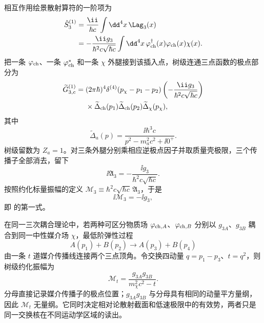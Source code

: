 \begin{exbox}
相互作用绘景散射算符的一阶项为
\begin{align*}
\hat S_3^{(1)}
&=\frac{\ii}{\hbar c}\int\dd^4 x\,\Lag_3(x)\\
&=-\frac{\ii g_3}{\hbar^2c\sqrt{\hbar c}}
\int\dd^4 x\,
\varphi_{\rm ch}^\dagger(x)\varphi_{\rm ch}(x)\chi(x).
\end{align*}
把一条 $\varphi_{\rm ch}$、一条 $\varphi_{\rm ch}^\ast$ 和一条 $\chi$ 外腿接到该插入点，树级连通三点函数的极点部分为
\begin{align*}
\widetilde G_{3,c}^{(1)}
={}&(2\pi\hbar)^4\delta^{(4)}(p_\chi-p_1-p_2)
\left(-\frac{\ii g_3}{\hbar^2c\sqrt{\hbar c}}\right)\\
&\times
\widetilde\Delta_{\rm ch}(p_1)
\widetilde\Delta_{\rm ch}(p_2)
\widetilde\Delta_\chi(p_\chi),
\end{align*}
其中
\begin{equation*}
\widetilde\Delta_a(p)
=\frac{\ii\hbar^3c}{p^2-m_a^2c^2+\ii0^+}.
\end{equation*}
树级留数为 $Z_a=1$。对三条外腿分别乘相应逆极点因子并取质量壳极限，三个传播子全部消去，留下
\begin{equation*}
\ii\mathfrak A_3
=-\frac{\ii g_3}{\hbar^2c\sqrt{\hbar c}}.
\end{equation*}
按照约化标量振幅的定义
$\mathcal M_3\equiv\hbar^2c\sqrt{\hbar c}\,\mathfrak A_3$，于是
\begin{equation*}
\ii\mathcal M_3=-\ii g_3,
\end{equation*}
即 的第一式。
\end{exbox}

在同一三次耦合理论中，若两种可区分物质场 $\varphi_{{\rm ch},A}$、$\varphi_{{\rm ch},B}$ 分别以 $g_{3A}$、$g_{3B}$ 耦合到同一中性媒介场 $\chi$，最低阶弹性过程
\[
A(p_1)+B(p_2)\to A(p_3)+B(p_4)
\]
由一条 $t$ 道媒介传播线连接两个三点顶角。令交换四动量 $q=p_1-p_3$、$t=q^2$，则树级约化振幅为
\begin{equation}
\boxed{
\mathcal M_t
=\frac{g_{3A}g_{3B}}{m_\chi^2c^2-t}.}
\label{eq:scalar-exchange-mphi-r15}
\end{equation}
分母直接记录媒介传播子的极点位置；$g_{3A}g_{3B}$ 与分母具有相同的动量平方量纲，因此 $\mathcal M_t$ 无量纲。它同时决定相对论散射截面和低速极限中的有效势，两者只是同一交换核在不同运动学区域的读出。

